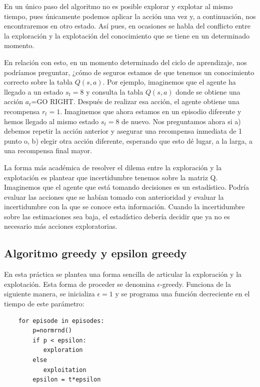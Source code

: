 \documentclass{article}
\begin{document}
En un único paso del algoritmo no es posible explorar y explotar al mismo tiempo, pues únicamente podemos aplicar la acción una vez y, a continuación, nos encontraremos en otro estado. Así pues, en ocasiones se habla del conflicto entre la exploración y la explotación del conocimiento que se tiene en un determinado momento.

En relación con esto, en un momento determinado del ciclo de aprendizaje, nos podríamos preguntar, ¿cómo de seguros estamos de que tenemos un conocimiento correcto sobre la tabla $Q(s,a)$. Por ejemplo, imaginemos que el agente ha llegado a un estado $s_t=8$ y consulta la tabla $Q(s,a)$ donde se obtiene una acción $a_t$=GO RIGHT. Después de realizar esa acción, el agente obtiene una recompensa $r_t=1$. Imaginemos que ahora estamos en un episodio diferente y hemos llegado al mismo estado $s_t=8$ de nuevo. Nos preguntamos ahora si a) debemos repetir la acción anterior y asegurar una recompensa inmediata de 1 punto o, b) elegir otra acción diferente, esperando que esto dé lugar, a la larga, a una recompensa final mayor.

La forma más académica de resolver el dilema entre la exploración y la explotación es plantear que incertidumbre tenemos sobre la matriz Q. Imaginemos que el agente que está tomando decisiones es un estadístico. Podría evaluar las acciones que se habían tomado con anterioridad y evaluar la incertidumbre con la que se conoce esta información. Cuando la incertidumbre sobre las estimaciones sea  baja, el estadístico debería decidir que ya no es necesario más acciones exploratorias.

\subsection{Algoritmo greedy y epsilon greedy}
En esta práctica se plantea una forma sencilla de articular la exploración y la explotación. Esta forma de proceder se denomina $\epsilon$-greedy. Funciona de la siguiente manera, se inicializa $\epsilon=1$ y se programa una función decreciente en el tiempo de este parámetro:
\begin{verbatim}
    for episode in episodes: 
        p=normrnd()
        if p < epsilon:
           exploration
        else
           exploitation
        epsilon = t*epsilon
\end{verbatim}
\end{document}
